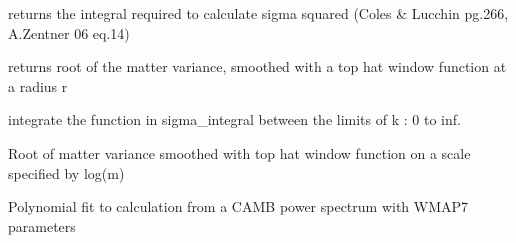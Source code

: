 \documentclass[letterpaper,10pt,english]{sphinxmanual}
\begin{document}
\begin{fulllineitems}

\begin{fulllineitems}
\label{PyCosmo:PyCosmo.powspec.PowSpec.sigma_integral}
returns the integral required to calculate sigma
squared (Coles \& Lucchin pg.266, A.Zentner 06 eq.14)

\end{fulllineitems}


\begin{fulllineitems}
\label{PyCosmo:PyCosmo.powspec.PowSpec.sigma_r}
returns root of the matter variance, smoothed 
with a top hat window function at a radius r

\end{fulllineitems}


\begin{fulllineitems}
\label{PyCosmo:PyCosmo.powspec.PowSpec.sigma_r_sq}
integrate the function in sigma\_integral
between the limits of k : 0 to inf.

\end{fulllineitems}


\begin{fulllineitems}
\label{PyCosmo:PyCosmo.powspec.PowSpec.sigma_r_sq_vec}
\end{fulllineitems}


\begin{fulllineitems}
\label{PyCosmo:PyCosmo.powspec.PowSpec.sigma_wmap7fit}
Root of matter variance smoothed with top hat window function on a scale
specified by log(m)

Polynomial fit to calculation from a CAMB power spectrum
with WMAP7 parameters

\end{fulllineitems}


\end{fulllineitems}
\end{document}
